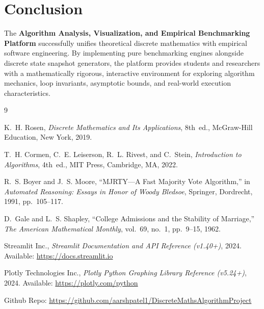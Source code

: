 \documentclass[11pt,a4paper]{article}
\theoremstyle{definition}
\theoremstyle{plain}
\theoremstyle{remark}
\begin{document}
\section{Conclusion}
The \textbf{Algorithm Analysis, Visualization, and Empirical Benchmarking Platform} successfully unifies theoretical discrete mathematics with empirical software engineering. By implementing pure benchmarking engines alongside discrete state snapshot generators, the platform provides students and researchers with a mathematically rigorous, interactive environment for exploring algorithm mechanics, loop invariants, asymptotic bounds, and real-world execution characteristics.

\begin{thebibliography}{9}

K.~H. Rosen,
\textit{Discrete Mathematics and Its Applications},
8th~ed., McGraw-Hill Education, New York, 2019.

T.~H. Cormen, C.~E. Leiserson, R.~L. Rivest, and C.~Stein,
\textit{Introduction to Algorithms},
4th~ed., MIT Press, Cambridge, MA, 2022.

R.~S. Boyer and J.~S. Moore,
``MJRTY---A Fast Majority Vote Algorithm,''
in \textit{Automated Reasoning: Essays in Honor of Woody Bledsoe},
Springer, Dordrecht, 1991, pp.~105--117.

D.~Gale and L.~S. Shapley,
``College Admissions and the Stability of Marriage,''
\textit{The American Mathematical Monthly},
vol.~69, no.~1, pp.~9--15, 1962.

Streamlit Inc.,
\textit{Streamlit Documentation and API Reference (v1.40+)},
2024. Available: \url{https://docs.streamlit.io}

Plotly Technologies Inc.,
\textit{Plotly Python Graphing Library Reference (v5.24+)},
2024. Available: \url{https://plotly.com/python}

Github Repo:
\hyperlink{https://github.com/aarshpatel1/DiscreteMathsAlgorithmProject}{https://github.com/aarshpatel1/DiscreteMathsAlgorithmProject}
\end{thebibliography}
\end{document}

